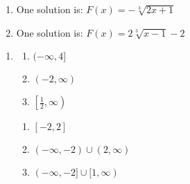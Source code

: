 \begin{multicols}{2}
\begin{enumerate}
\setcounter{enumi}{\value{HW}}

\item One solution is:  $F(x) = -\sqrt[3]{2x+1}$

\item One solution is:  $F(x) =2\sqrt[3]{x-1}-2$

\setcounter{HW}{\value{enumi}}
\end{enumerate}
\end{multicols}

\begin{enumerate}
\setcounter{enumi}{\value{HW}}

\item 

\begin{multicols}{3}

\begin{enumerate}

\item   $(-\infty, 4]$  \vphantom{$\left[ \frac{1}{2}, \infty \right)$}

\item   $(-2, \infty)$ \vphantom{$\left[ \frac{1}{2}, \infty \right)$}

\item $\left[ \frac{1}{2}, \infty \right)$

\setcounter{HWindent}{\value{enumii}}

\end{enumerate}
\end{multicols}

\begin{multicols}{3}

\begin{enumerate}
\setcounter{enumii}{\value{HWindent}}

\item   $[-2,2]$

\item   $(-\infty, -2) \cup (2, \infty)$

\item   $(-\infty, -2] \cup [1, \infty)$

\end{enumerate}

\end{multicols}

\setcounter{HW}{\value{enumi}}
\end{enumerate}




